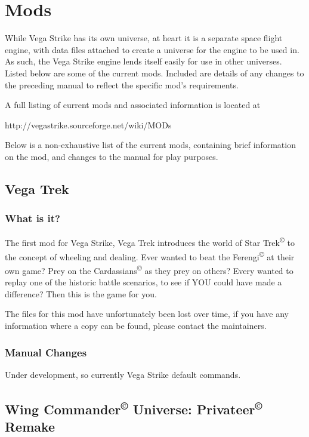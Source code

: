 \documentclass{article}
\begin{document}
\section{ Mods }

While Vega Strike has its own universe, at heart it is a separate space flight engine, with data files attached to create a universe for the engine to be used in.  As such, the Vega Strike engine lends itself easily for use in other universes. Listed below are some of the current mods. Included are details of any changes to the preceding manual to reflect the specific mod's requirements. 

A full listing of current mods and associated information is located at 

http://vegastrike.sourceforge.net/wiki/MODs

Below is a non-exhaustive list of the current mods, containing brief information on the mod, and changes to the manual for play purposes. 

\subsection{ Vega Trek }

\subsubsection{ What is it? }

The first mod for Vega Strike, Vega Trek introduces the world of Star Trek\textsuperscript{\copyright} to the concept of wheeling and dealing. Ever wanted to beat the Ferengi\textsuperscript{\copyright}  at their own game? Prey on the Cardassians\textsuperscript{\copyright}  as they prey on others? Every wanted to replay one of the historic battle scenarios, to see if YOU could have made a difference?  Then this is the game for you.

The files for this mod have unfortunately been lost over time, if you have any information where a copy can be found, please contact the maintainers.

\subsubsection{ Manual Changes }

Under development, so currently Vega Strike default commands. 

\subsection{ Wing Commander\textsuperscript{\copyright}  Universe: Privateer\textsuperscript{\copyright}  Remake }
\end{document}
